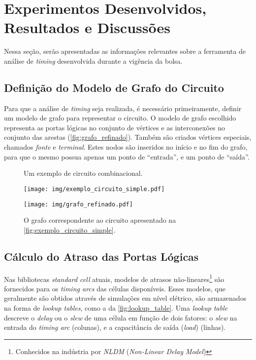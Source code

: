 \documentclass[
	12pt,				%
	openright,			%
	twoside,			%
	a4paper,			%
	english,			%
	french,				%
	spanish,			%
	brazil,				%
	]{abntex2}
\begin{document}
\section{Experimentos Desenvolvidos, Resultados e Discussões}

Nessa seção, serão apresentadas as informações relevantes sobre a ferramenta de análise de \textit{timing} desenvolvida durante a vigência da bolsa.

\subsection{Definição do Modelo de Grafo do Circuito}
Para que a análise de \textit{timing} seja realizada, é necessário primeiramente, definir um modelo de grafo para representar o circuito. O modelo de grafo escolhido representa as portas lógicas no conjunto de vértices e as interconexões no conjunto das arestas (\autoref{fig:grafo_refinado}). Também são criados vértices especiais, chamados \textit{fonte} e \textit{terminal}. Estes nodos são inseridos no início e no fim do grafo, para que o mesmo possua apenas um ponto de ``entrada'', e um ponto de ``saída''.


\begin{figure}[htb]
\label{fig:circuito_e_grafo}
	\centering
	\begin{minipage}{0.49\textwidth}
		
		\caption{\label{fig:exemplo_circuito_simple}Um exemplo de circuito combinacional.}
		\texttt{[image: img/exemplo\_circuito\_simple.pdf]}
	\end{minipage}
	\hfill
	\begin{minipage}{0.49\textwidth}
		
		\caption{\label{fig:grafo_refinado}O grafo correspondente ao circuito apresentado na \autoref{fig:exemplo_circuito_simple}.}
		\texttt{[image: img/grafo\_refinado.pdf]}
	\end{minipage}
\end{figure}



\subsection{Cálculo do Atraso das Portas Lógicas}
Nas bibliotecas \textit{standard cell} atuais, modelos de atrasos não-lineares\footnote{Conhecidos na indústria por \textit{NLDM} (\textit{Non-Linear Delay Model})} são fornecidos para os \textit{timing arcs} das células disponíveis. Esses modelos, que geralmente são obtidos através de simulações em nível elétrico, são armazenados na forma de \textit{lookup tables}, como a da \autoref{fig:lookup_table}. Uma \textit{lookup table} descreve o \textit{delay} ou o \textit{slew} de uma célula em função de dois fatores: o \textit{slew} na entrada do \textit{timing arc} (colunas), e a capacitância de saída (\textit{load}) (linhas).
\end{document}
